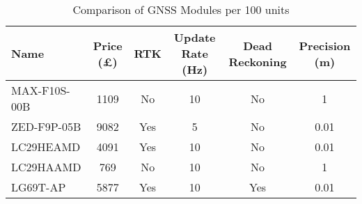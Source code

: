 \begin{table}[h]
  \centering
  \begin{tabular}{lccccc}
    \toprule
    \textbf{Name} & \textbf{Price (£)} & \textbf{RTK} & \textbf{Update Rate (Hz)} & \textbf{Dead Reckoning} & \textbf{Precision (m)} \\
    \midrule
    MAX-F10S-00B\cite{ublox_max_f10s} & 1109 & No  & 10 & No  & 1    \\
    ZED-F9P-05B\cite{ublox_zed_f9p}    & 9082 & Yes & 5  & No  & 0.01 \\
    LC29HEAMD\cite{quectel_product_brochure_v8_3}& 4091 & Yes & 10 & No  & 0.01 \\
    LC29HAAMD\cite{quectel_product_brochure_v8_3} & 769  & No  & 10 & No  & 1    \\
    LG69T-AP\cite{quectel_product_brochure_v8_3} & 5877 & Yes & 10 & Yes & 0.01 \\
    \bottomrule
  \end{tabular}
  \caption{Comparison of GNSS Modules per 100 units}
  \label{tab:gnss-modules}
\end{table}